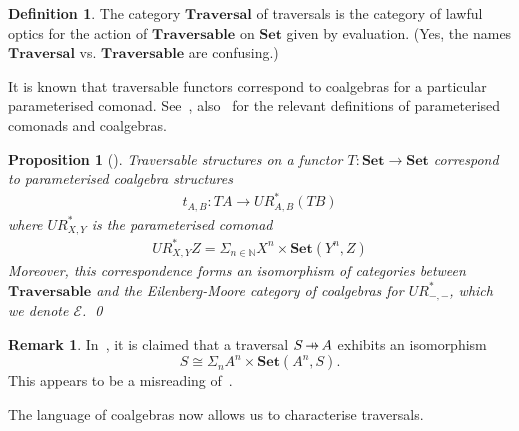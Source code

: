 \documentclass[11pt,letterpaper]{article}
\theoremstyle{plain}
\newtheorem{proposition}[theorem]{Proposition}
\theoremstyle{definition}
\newtheorem{definition}[theorem]{Definition}
\newtheorem{remark}[theorem]{Remark}
\newcommand{\E}{\mathscr{E}}
\newcommand{\bN}{\mathbb{N}}
\newcommand{\Set}{\mathbf{Set}}
\newcommand{\Traversable}{\mathbf{Traversable}}
\newcommand{\Traversal}{\mathbf{Traversal}}
\newcommand{\hto}{\ensuremath{\,\mathaccent\shortmid\rightarrow\,}}
\begin{document}
\begin{definition}
The category $\Traversal$ of traversals is the category of lawful optics for the action of $\Traversable$ on $\Set$ given by evaluation. (Yes, the names $\Traversal$ vs\@. $\Traversable$ are confusing.)
\end{definition}

It is known that traversable functors correspond to coalgebras for a particular parameterised comonad. See~{\cite[Definition 4.1, 4.2]{SecondOrderFunctionals}}, also~\cite{AlgebrasForParameterisedMonads} for the relevant definitions of parameterised comonads and coalgebras.

\begin{proposition}[{\cite[Theorem 4.10, Proposition 5.4]{SecondOrderFunctionals}}]
Traversable structures on a functor $T : \Set \to \Set$ correspond to parameterised coalgebra structures
\begin{align*}
t_{A, B} : TA \to UR^*_{A, B}(T B)
\end{align*}
where $UR^*_{X,Y}$ is the parameterised comonad
\begin{align*}
UR^*_{X, Y} Z = \Sigma_{n\in \bN} X^n \times \Set(Y^n,Z)
\end{align*}
Moreover, this correspondence forms an isomorphism of categories between $\Traversable$ and the Eilenberg-Moore category of coalgebras for $UR^*_{-, -}$, which we denote $\E$. \qed
\end{proposition}


\begin{remark}
In~\cite[Section 2.3]{ProfunctorOptics}, it is claimed that a traversal $S \hto A$ exhibits an isomorphism \[S \cong \Sigma_n A^n \times \Set(A^n,S).\] This appears to be a misreading of~\cite[Proposition 5.4]{SecondOrderFunctionals}.
\end{remark}

The language of coalgebras now allows us to characterise traversals.
\end{document}
